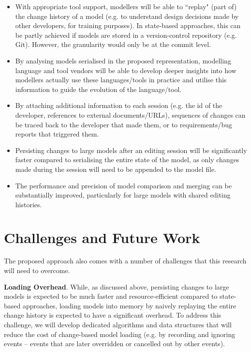 \begin{itemize}
    \item With appropriate tool support, modellers will be able to ``replay" (part of) the change history of a model (e.g. to understand design decisions made by other developers, for training purposes). In state-based approaches, this can be partly achieved if models are stored in a version-control repository (e.g. Git). However, the granularity would only be at the commit level.
    \item By analysing models serialised in the proposed representation, modelling language and tool vendors will be able to develop deeper insights into how modellers actually use these languages/tools in practice and utilise this information to guide the evolution of the language/tool.
    \item By attaching additional information to each session (e.g. the id of the developer, references to external documents/URLs), sequences of changes can be traced back to the developer that made them, or to requirements/bug reports that triggered them.
    \item Persisting changes to large models after an editing session will be significantly faster compared to serialising the entire state of the model, as only changes made during the session will need to be appended to the model file.
    \item The performance and precision of model comparison and merging can be substantially improved, particularly for large models with shared editing histories.
\end{itemize}

\section{Challenges and Future Work}
\label{sec:challenges_and_future_works}
The proposed approach also comes with a number of challenges that this research will need to overcome.

\textbf{Loading Overhead}. While, as discussed above, persisting changes to large models is expected to be much faster and resource-efficient compared to state-based approaches, loading models into memory by naively replaying the entire change history is expected to have a significant overhead. To address this challenge, we will develop dedicated algorithms and data structures that will reduce the cost of change-based model loading (e.g. by recording and ignoring events -- events that are later overridden or cancelled out by other events). 

